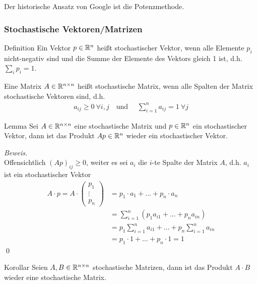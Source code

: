 Der historische Ansatz von Google ist die Potenzmethode.

\newpage

\subsubsection{Stochastische Vektoren/Matrizen}
\begin{colbox}{Definition}
  Ein Vektor $p\in\mathbb R^n$ heißt stochastischer Vektor, wenn alle Elemente $p_i$ nicht-negativ sind und die 
  Summe der Elemente des Vektors gleich 1 ist, d.h. $\sum_{i} p_i = 1$. 

  Eine Matrix $A\in\mathbb R^{n\times n}$ heißt stochastische Matrix, wenn alle Spalten der Matrix stochastische 
  Vektoren sind, d.h.
  \begin{align*}
    a_{ij}\geq 0\ \forall i,j \quad \text{und } \quad \sum_{i=1}^n a_{ij}=1\ \forall j
  \end{align*}

\end{colbox}

\begin{colbox}{Lemma}
  Sei $A\in\mathbb R^{n\times n}$ eine stochastische Matrix und $p\in\mathbb R^{n}$ ein stochastischer Vektor, dann ist 
  das Produkt $Ap\in\mathbb R^{n}$ wieder ein stochastischer Vektor.
\end{colbox}

\textit{Beweis.} \\
Offensichtlich $(Ap)_{ij}\geq 0$, weiter es sei $a_i$ die $i$-te Spalte der Matrix $A$, d.h. $a_i$ ist ein stochastischer Vektor
\begin{align*}
  A\cdot p = A\cdot \begin{pmatrix}
  p_1 \\ \vdots \\ p_n
\end{pmatrix} &= p_1\cdot a_1 + \dots + p_n\cdot a_n \\
&= \sum_{i=1}^n (p_1a_{i1} + \dots + p_na_{in}) \\
&= p_1\sum_{i=1}^n a_{i1} + \dots +  p_n\sum_{i=1}^na_{in} \\
&= p_1\cdot 1 + \dots + p_n\cdot 1 = 1
\end{align*}
\qed

\begin{colbox}{Korollar}\label{cor:stochMatProd}
  Seien $A,B\in\mathbb R^{n\times n}$ stochastische Matrizen, dann ist das Produkt $A\cdot B$ wieder eine stochastische Matrix.
\end{colbox}

